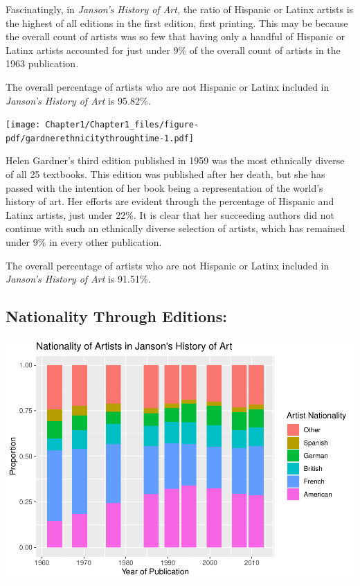 \documentclass[
  letterpaper,
  DIV=11,
  numbers=noendperiod]{scrreprt}
\begin{document}
Fascinatingly, in \emph{Janson's History of Art,} the ratio of Hispanic
or Latinx artists is the highest of all editions in the first edition,
first printing. This may be because the overall count of artists was so
few that having only a handful of Hispanic or Latinx artists accounted
for just under 9\% of the overall count of artists in the 1963
publication.

The overall percentage of artists who are not Hispanic or Latinx
included in \emph{Janson's History of Art} is 95.82\%.

\texttt{[image: Chapter1/Chapter1\_files/figure-pdf/gardnerethnicitythroughtime-1.pdf]}

Helen Gardner's third edition published in 1959 was the most ethnically
diverse of all 25 textbooks. This edition was published after her death,
but she has passed with the intention of her book being a representation
of the world's history of art. Her efforts are evident through the
percentage of Hispanic and Latinx artists, just under 22\%. It is clear
that her succeeding authors did not continue with such an ethnically
diverse selection of artists, which has remained under 9\% in every
other publication.

The overall percentage of artists who are not Hispanic or Latinx
included in \emph{Janson's History of Art} is 91.51\%.

\hypertarget{nationality-through-editions}{%
\subsection{\texorpdfstring{\textbf{Nationality Through
Editions:}}{Nationality Through Editions:}}\label{nationality-through-editions}}

\includegraphics{Chapter1/Chapter1_files/figure-pdf/jansonnationalitythroughtime-1.pdf}
\end{document}
